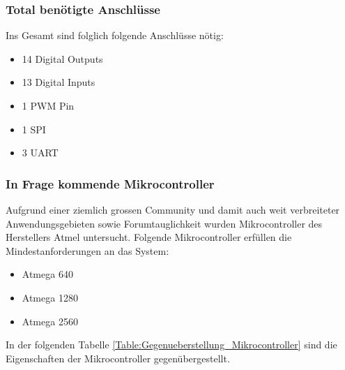 \subsubsection{Total benötigte Anschlüsse}\label{par:Anforderungen_Mikrocontroller_Zus}

Ins Gesamt sind folglich folgende Anschlüsse nötig:
\begin{itemize}
	\item 14 Digital Outputs
	\item 13 Digital Inputs
	\item 1 PWM Pin
	\item 1 SPI
	\item 3 UART
\end{itemize}

\subsubsection{In Frage kommende Mikrocontroller}\label{par:In_Frage_kommender_Mikrocontroller}

Aufgrund einer ziemlich grossen Community und damit auch weit verbreiteter Anwendungsgebieten sowie Forumtauglichkeit wurden Mikrocontroller des Herstellers Atmel untersucht. Folgende Mikrocontroller erfüllen die Mindestanforderungen an das System:

\begin{itemize}
\item Atmega 640
\item Atmega 1280
\item Atmega 2560
\end{itemize}

In der folgenden Tabelle \ref{Table:Gegenueberstellung_Mikrocontroller} sind die Eigenschaften der Mikrocontroller gegenübergestellt.

